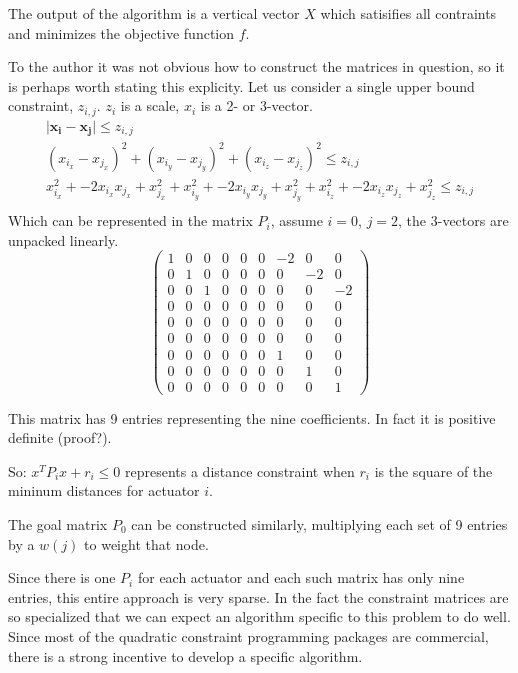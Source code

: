 \documentclass[11pt]{article}
\begin{document}
The output of the algorithm is a vertical vector $X$ which satisifies all contraints and minimizes the objective function $f$.

To the author it was not obvious how to construct the matrices in question, so it is perhaps worth stating this explicity.
Let us consider a single upper bound constraint, $z_{i,j}$. $z_i$ is a scale, $x_i$ is a 2- or 3-vector.
\begin{align*}
  \vert \mathbf{x_i} - \mathbf{x_j} \rvert  \leq z_{i,j} \\
  (x_{i_x} - x_{j_x})^2 + (x_{i_y} - x_{j_y})^2 + (x_{{i_z}} - x_{j_z})^2  \leq z_{i,j} \\
 x_{i_x}^2 + -2x_{i_x}x_{j_x} +  x_{j_x}^2 + x_{i_y}^2 + -2x_{i_y}x_{j_y} + x_{j_y}^2 + x_{i_z}^2 + -2x_{i_z}x_{j_z}+ x_{j_z}^2  \leq z_{i,j} \\  
\end{align*}
Which can be represented in the matrix $P_i$, assume $i = 0$, $j = 2$, the 3-vectors are unpacked linearly.
\[
\begin{pmatrix}
  1 & 0 & 0 & 0 & 0 & 0 & -2 & 0 & 0  \\
  0 & 1 & 0 & 0 & 0 & 0 & 0 & -2 & 0  \\
  0 & 0 & 1 & 0 & 0 & 0 & 0 & 0 & -2  \\
  0 & 0 & 0 & 0 & 0 & 0 & 0 & 0 & 0  \\
  0 & 0 & 0 & 0 & 0 & 0 & 0 & 0 & 0  \\
  0 & 0 & 0 & 0 & 0 & 0 & 0 & 0 & 0  \\
  0 & 0 & 0 & 0 & 0 & 0 & 1 & 0 & 0  \\
  0 & 0 & 0 & 0 & 0 & 0 & 0 & 1 & 0  \\
  0 & 0 & 0 & 0 & 0 & 0 & 0 & 0 & 1 
\end{pmatrix}
\]

This matrix has 9 entries representing the nine coefficients. In fact it is
positive definite (proof?).

So: $ x^TP_ix + r_i \leq 0 $ represents a distance constraint when $r_i$ is the square of
the mininum distances for actuator $i$.

The goal matrix $P_0$ can be constructed similarly, multiplying each set of 9 entries by
a $w(j)$ to weight that node.

Since there is one $P_i$ for each actuator and each such matrix has only nine entries,
this entire approach is very
sparse. In the fact the constraint matrices are so specialized that
we can expect an algorithm specific to this
problem to do well.  Since most of the quadratic constraint
programming packages are commercial, there is a strong
incentive to develop a specific algorithm.
\end{document}
